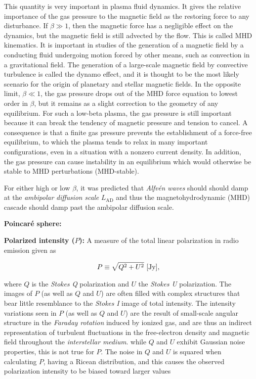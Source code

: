 \documentclass[a4paper,10pt]{article}
\begin{document}
{\noindent}This quantity is very important in plasma fluid dynamics. It gives the relative importance of the gas pressure to the magnetic field as the restoring force to any disturbance. If $\beta\gg1$, then the magnetic force has a negligible effect on the dynamics, but the magnetic field is still advected by the flow. This is called MHD kinematics. It is important in studies of the generation of a magnetic field by a conducting fluid undergoing motion forced by other means, such as convection in a gravitational field. The generation of a large-scale magnetic field by convective turbulence is called the dynamo effect, and it is thought to be the most likely scenario for the origin of planetary and stellar magnetic fields. In the opposite limit, $\beta\ll1$, the gas pressure drops out of the MHD force equation to lowest order in $\beta$, but it remains as a slight correction to the geometry of any equilibrium. For such a low-beta plasma, the gas pressure is still important because it can break the tendency of magnetic pressure and tension to cancel. A consequence is that a finite gas pressure prevents the establishment of a force-free equilibrium, to which the plasma tends to relax in many important configurations, even in a situation with a nonzero current density. In addition, the gas pressure can cause instability in an equilibrium which would otherwise be stable to MHD perturbations (MHD-stable).

{\noindent}For either high or low $\beta$, it was predicted that \textit{Alfv\'en waves} should should damp at the \textit{ambipolar diffusion scale} $L_\mathrm{AD}$ and thus the magnetohydrodynamic (MHD) cascade should damp past the ambipolar diffusion scale.

{\noindent}\textbf{Poincar\'e sphere:}

{\noindent}\textbf{Polarized intensity ($P$):} A measure of the total linear polarization in radio emission given as

\begin{align*}
    P\equiv\sqrt{Q^2+U^2} ~ [{\rm Jy}],
\end{align*}

{\noindent}where $Q$ is the \textit{Stokes Q} polarization and $U$ the \textit{Stokes U} polarization. The images of $P$ (as well as $Q$ and $U$) are often filled with complex structures that bear little resemblance to the \textit{Stokes I} image of total intensity. The intensity variations seen in $P$ (as well as $Q$ and $U$) are the result of small-scale angular structure in the \textit{Faraday rotation} induced by ionized gas, and are thus an indirect representation of turbulent fluctuations in the free-electron density and magnetic field throughout the \textit{interstellar medium}. while $Q$ and $U$ exhibit Gaussian noise properties, this is not true for $P$. The noise in $Q$ and $U$ is squared when calculating $P$, having a Ricean distribution, and this causes the observed polarization intensity to be biased toward larger values
\end{document}
